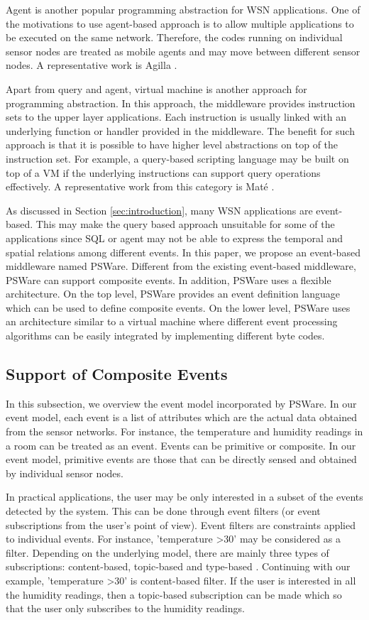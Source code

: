 Agent is another popular programming abstraction for WSN applications. One of the motivations to use agent-based approach is to allow multiple applications to be executed on the same network. Therefore, the codes running on individual sensor nodes are treated as mobile agents and may move between different sensor nodes. A representative work is Agilla \cite{agilla}.

Apart from query and agent, virtual machine is another approach for programming abstraction. In this approach, the middleware provides instruction sets to the upper layer applications. Each instruction is usually linked with an underlying function or handler provided in the middleware. The benefit for such approach is that it is possible to have higher level abstractions on top of the instruction set. For example, a query-based scripting language may be built on top of a VM if the underlying instructions can support query operations effectively. A representative work from this category is Mat\'{e} \cite{mate}.

As discussed in Section \ref{sec:introduction}, many WSN applications are event-based. This may make the query based approach unsuitable for some of the applications since SQL or agent may not be able to express the temporal and spatial relations among different events. In this paper, we propose an event-based middleware named PSWare. Different from the existing event-based middleware, PSWare can support composite events. In addition, PSWare uses a flexible architecture. On the top level, PSWare provides an event definition language which can be used to define composite events. On the lower level, PSWare uses an architecture similar to a virtual machine where different event processing algorithms can be easily integrated by implementing different byte codes.

\subsection{Support of Composite Events}
In this subsection, we overview the event model incorporated by PSWare. In our event model, each event is a list of attributes which are the actual data obtained from the sensor networks. For instance, the temperature and humidity readings in a room can be treated as an event. Events can be primitive or composite. In our event model, primitive events are those that can be directly sensed and obtained by individual sensor nodes.

In practical applications, the user may be only interested in a subset of the events detected by the system. This can be done through event filters (or event subscriptions from the user's point of view). Event filters are constraints applied to individual events. For instance, 'temperature \textgreater 30' may be considered as a filter. Depending on the underlying model, there are mainly three types of subscriptions: content-based, topic-based and type-based \cite{facespubsub}. Continuing with our example, 'temperature \textgreater 30' is content-based filter. If the user is interested in all the humidity readings, then a topic-based subscription can be made which so that the user only subscribes to the humidity readings. 

